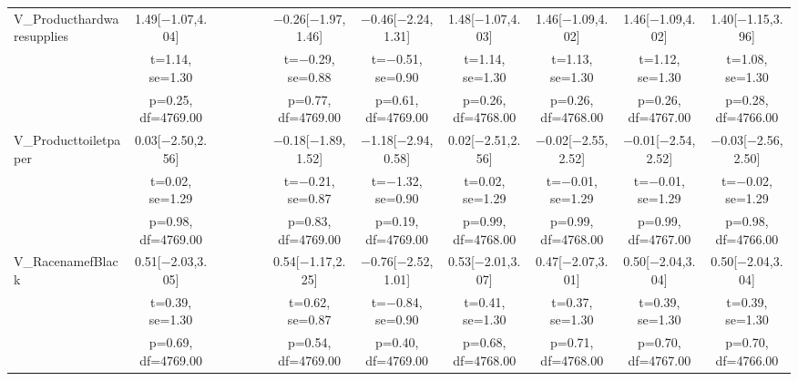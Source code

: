 \documentclass[]{report}
\begin{document}
\begin{table}
{\begin{tabular}[t]{lccccccccccc}
		V\_Producthardwaresupplies & \num{1.49}[\num{-1.07},\num{4.04}] &  &  &  &  & \num{-0.26}[\num{-1.97},\num{1.46}] & \num{-0.46}[\num{-2.24},\num{1.31}] & \num{1.48}[\num{-1.07},\num{4.03}] & \num{1.46}[\num{-1.09},\num{4.02}] & \num{1.46}[\num{-1.09},\num{4.02}] & \num{1.40}[\num{-1.15},\num{3.96}]\\
		& t=\num{1.14}, se=\num{1.30} &  &  &  &  & t=\num{-0.29}, se=\num{0.88} & t=\num{-0.51}, se=\num{0.90} & t=\num{1.14}, se=\num{1.30} & t=\num{1.13}, se=\num{1.30} & t=\num{1.12}, se=\num{1.30} & t=\num{1.08}, se=\num{1.30}\\
		& p=\num{0.25}, df=\num{4769.00} &  &  &  &  & p=\num{0.77}, df=\num{4769.00} & p=\num{0.61}, df=\num{4769.00} & p=\num{0.26}, df=\num{4768.00} & p=\num{0.26}, df=\num{4768.00} & p=\num{0.26}, df=\num{4767.00} & p=\num{0.28}, df=\num{4766.00}\\
		V\_Producttoiletpaper & \num{0.03}[\num{-2.50},\num{2.56}] &  &  &  &  & \num{-0.18}[\num{-1.89},\num{1.52}] & \num{-1.18}[\num{-2.94},\num{0.58}] & \num{0.02}[\num{-2.51},\num{2.56}] & \num{-0.02}[\num{-2.55},\num{2.52}] & \num{-0.01}[\num{-2.54},\num{2.52}] & \num{-0.03}[\num{-2.56},\num{2.50}]\\
		& t=\num{0.02}, se=\num{1.29} &  &  &  &  & t=\num{-0.21}, se=\num{0.87} & t=\num{-1.32}, se=\num{0.90} & t=\num{0.02}, se=\num{1.29} & t=\num{-0.01}, se=\num{1.29} & t=\num{-0.01}, se=\num{1.29} & t=\num{-0.02}, se=\num{1.29}\\
		& p=\num{0.98}, df=\num{4769.00} &  &  &  &  & p=\num{0.83}, df=\num{4769.00} & p=\num{0.19}, df=\num{4769.00} & p=\num{0.99}, df=\num{4768.00} & p=\num{0.99}, df=\num{4768.00} & p=\num{0.99}, df=\num{4767.00} & p=\num{0.98}, df=\num{4766.00}\\
		V\_RacenamefBlack & \num{0.51}[\num{-2.03},\num{3.05}] &  &  &  &  & \num{0.54}[\num{-1.17},\num{2.25}] & \num{-0.76}[\num{-2.52},\num{1.01}] & \num{0.53}[\num{-2.01},\num{3.07}] & \num{0.47}[\num{-2.07},\num{3.01}] & \num{0.50}[\num{-2.04},\num{3.04}] & \num{0.50}[\num{-2.04},\num{3.04}]\\
		& t=\num{0.39}, se=\num{1.30} &  &  &  &  & t=\num{0.62}, se=\num{0.87} & t=\num{-0.84}, se=\num{0.90} & t=\num{0.41}, se=\num{1.30} & t=\num{0.37}, se=\num{1.30} & t=\num{0.39}, se=\num{1.30} & t=\num{0.39}, se=\num{1.30}\\
		& p=\num{0.69}, df=\num{4769.00} &  &  &  &  & p=\num{0.54}, df=\num{4769.00} & p=\num{0.40}, df=\num{4769.00} & p=\num{0.68}, df=\num{4768.00} & p=\num{0.71}, df=\num{4768.00} & p=\num{0.70}, df=\num{4767.00} & p=\num{0.70}, df=\num{4766.00}\\

\end{tabular}}
\end{table}
\end{document}
